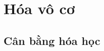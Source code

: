 \documentclass[Main.tex]{subfiles}
\begin{document}
	\setcounter{tocdepth}{2}%
	\tableofcontents%
	\part{Hóa vô cơ}
	\chapter{Cân bằng hóa học}
	\hienthiloigiai
	
	
\end{document}
